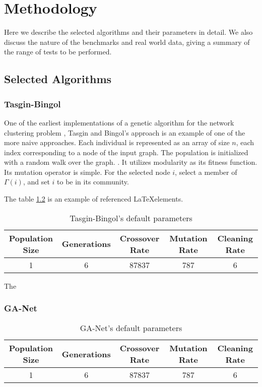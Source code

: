 \chapter{Methodology}
Here we describe the selected algorithms and their parameters in detail. We also discuss the nature of the benchmarks and real world data, giving a summary of the range of tests to be performed. 

\section{Selected Algorithms}
\subsection{Tasgin-Bingol}
One of the earliest implementations of a genetic algorithm for the network clustering problem \cite{Tasgin2006}, Tasgin and Bingol's approach is an example of one of the more naive approaches. Each individual is represented as an array of size $n$, each index corresponding to a node of the input graph. The population is initialized with a random walk over the graph. . It utilizes modularity as its fitness function. Its mutation operator is simple. For the selected node $i$, select a member of $\Gamma(i)$, and set $i$ to be in its community.

The table \ref{table:1} is an example of referenced \LaTeX elements.

\begin{table}[h!]
	\centering
	\begin{tabular}{| c | c | c | c | c |}
		\hline
		Population Size & Generations & Crossover Rate & Mutation Rate  & Cleaning Rate \\ [0.5ex] 
		\hline
		1 & 6 & 87837 & 787 & 6  \\ 

		\hline
	\end{tabular}
	\caption{Tasgin-Bingol's default parameters}
	\label{table:1}
\end{table}

The



\subsection{GA-Net}
\cite{Pizzuti2008}
\begin{table}[h!]
	\centering
	\begin{tabular}{| c | c | c | c | c |}
		\hline
		Population Size & Generations & Crossover Rate & Mutation Rate  & Cleaning Rate \\ [0.5ex] 
		\hline
		1 & 6 & 87837 & 787 & 6  \\ 
		
		\hline
	\end{tabular}
	\caption{GA-Net's default parameters}
	\label{table:1}
\end{table}


